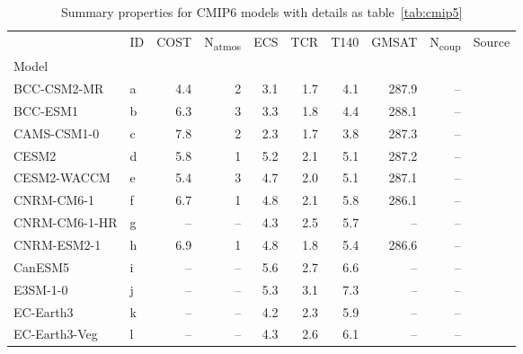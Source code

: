 \begin{table}
\centering
\caption{Summary properties for CMIP6 models with details as table~\ref{tab:cmip5}}
\label{tab:cmip6}
\begin{tabular}{llrrrrrrrl}
\toprule
{} &  ID &  COST &  N\textsubscript{atmos} &  ECS &  TCR &  T140 &  GMSAT &  N\textsubscript{coup} &                Source \\
Model           &     &       &                         &      &      &       &        &                        &                       \\
\midrule
BCC-CSM2-MR     &   a &   4.4 &                       2 &  3.1 &  1.7 &   4.1 &  287.9 &                   -- &  \citet{ringer20cmip} \\
BCC-ESM1        &   b &   6.3 &                       3 &  3.3 &  1.8 &   4.4 &  288.1 &                   -- &  \citet{ringer20cmip} \\
CAMS-CSM1-0     &   c &   7.8 &                       2 &  2.3 &  1.7 &   3.8 &  287.3 &                   -- &  \citet{ringer20cmip} \\
CESM2           &   d &   5.8 &                       1 &  5.2 &  2.1 &   5.1 &  287.2 &                   -- &  \citet{ringer20cmip} \\
CESM2-WACCM     &   e &   5.4 &                       3 &  4.7 &  2.0 &   5.1 &  287.1 &                   -- &  \citet{ringer20cmip} \\
CNRM-CM6-1      &   f &   6.7 &                       1 &  4.8 &  2.1 &   5.8 &  286.1 &                   -- &  \citet{ringer20cmip} \\
CNRM-CM6-1-HR   &   g &    -- &                    -- &  4.3 &  2.5 &   5.7 &     -- &                   -- &  \citet{ringer20cmip} \\
CNRM-ESM2-1     &   h &   6.9 &                       1 &  4.8 &  1.8 &   5.4 &  286.6 &                   -- &  \citet{ringer20cmip} \\
CanESM5         &   i &    -- &                    -- &  5.6 &  2.7 &   6.6 &     -- &                   -- &  \citet{ringer20cmip} \\
E3SM-1-0        &   j &    -- &                    -- &  5.3 &  3.1 &   7.3 &     -- &                   -- &  \citet{ringer20cmip} \\
EC-Earth3       &   k &    -- &                    -- &  4.2 &  2.3 &   5.9 &     -- &                   -- &  \citet{ringer20cmip} \\
EC-Earth3-Veg   &   l &    -- &                    -- &  4.3 &  2.6 &   6.1 &     -- &                   -- &  \citet{ringer20cmip} \\

\end{tabular}
\end{table}
